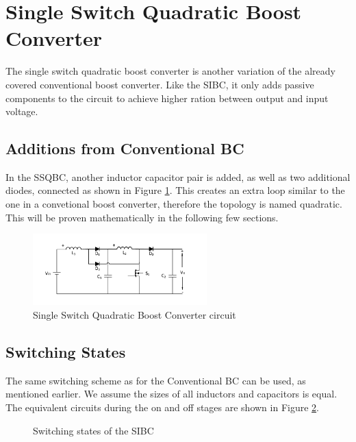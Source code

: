 \section{Single Switch Quadratic Boost Converter}\label{ch:SSQBC}

The single switch quadratic boost converter is another variation of the already covered conventional boost converter. Like the SIBC, it only adds passive components to the circuit to achieve higher ration between output and input voltage. 

\subsection{Additions from Conventional BC}
In the SSQBC,
another inductor capacitor pair is added, as well as two additional diodes, connected as shown in Figure \ref{fig:SSQBC}. This creates an extra loop similar to the one in a convetional boost converter, therefore the topology is named quadratic. This will be proven mathematically in the following few sections.

\begin{figure} [H]
   \centering
   \includegraphics[width=0.6\textwidth]{figures/cSingleSwitchQuadraticBC/Quadratic_boost.pdf}
    \caption{Single Switch Quadratic Boost Converter circuit}
	\label{fig:SSQBC}
\end{figure}
\subsection{Switching States}
The same switching scheme as for the Conventional BC can be used,
as mentioned earlier. We assume the sizes of all inductors and capacitors is equal.
The equivalent circuits during the on and off stages are shown in Figure \ref{fig:SSQBC_States}.

\begin{figure}[H]%
    \centering
    \qquad
    \caption{Switching states of the SIBC}%
     \label{fig:SSQBC_States}%
\end{figure}

